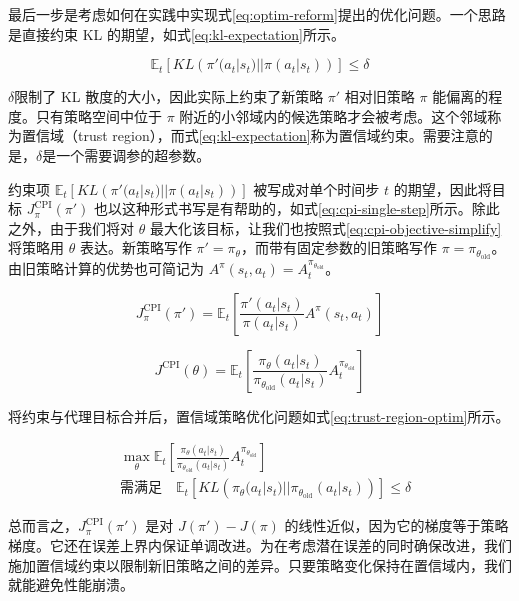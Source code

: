 \documentclass[lang=cn,newtx,10pt,scheme=chinese]{elegantbook}
\begin{document}
最后一步是考虑如何在实践中实现式\ref{eq:optim-reform}提出的优化问题。一个思路是直接约束 KL 的期望，如式\ref{eq:kl-expectation}所示。

\begin{equation}\label{eq:kl-expectation}
\mathbb{E}_t[KL\left(\pi'(a_t|s_t)||\pi(a_t|s_t)\right)]\leq\delta
\end{equation}

$\delta$限制了 KL 散度的大小，因此实际上约束了新策略 $\pi'$ 相对旧策略 $\pi$ 能偏离的程度。只有策略空间中位于 $\pi$ 附近的小邻域内的候选策略才会被考虑。这个邻域称为置信域（trust region），而式\ref{eq:kl-expectation}称为置信域约束。需要注意的是，$\delta$是一个需要调参的超参数。

约束项 $\mathbb{E}_t[KL\left(\pi'(a_t|s_t)||\pi(a_t|s_t)\right)]$ 被写成对单个时间步 $t$ 的期望，因此将目标 $J_\pi^\text{CPI}(\pi')$ 也以这种形式书写是有帮助的，如式\ref{eq:cpi-single-step}所示。除此之外，由于我们将对 $\theta$ 最大化该目标，让我们也按照式\ref{eq:cpi-objective-simplify}将策略用 $\theta$ 表达。新策略写作 $\pi'=\pi_\theta$，而带有固定参数的旧策略写作 $\pi=\pi_{\theta_\text{old}}$。由旧策略计算的优势也可简记为 $A^\pi(s_t,a_t)=A^{\pi_{\theta_\text{old}}}_t$。

\begin{equation}\label{eq:cpi-single-step}
J_\pi^\text{CPI}(\pi') = \mathbb{E}_t\left[ \frac{\pi'(a_t|s_t)}{\pi(a_t|s_t)}A^\pi(s_t,a_t) \right]
\end{equation}

\begin{equation}\label{eq:cpi-objective-simplify}
J^\text{CPI}(\theta) = \mathbb{E}_t\left[ \frac{\pi_\theta(a_t|s_t)}{\pi_{\theta_\text{old}}(a_t|s_t)}A_t^{\pi_{\theta_\text{old}}} \right]
\end{equation}

将约束与代理目标合并后，置信域策略优化问题如式\ref{eq:trust-region-optim}所示。

\begin{equation}\label{eq:trust-region-optim}
\begin{aligned}
& \max_\theta\mathbb{E}_t\left[ \frac{\pi_\theta(a_t|s_t)}{\pi_{\theta_\text{old}}(a_t|s_t)}A_t^{\pi_{\theta_\text{old}}} \right] \\
& \text{需满足}\quad\mathbb{E}_t[KL\left(\pi_\theta(a_t|s_t)||\pi_{\theta_\text{old}}(a_t|s_t)\right)]\leq\delta
\end{aligned}
\end{equation}

总而言之，$J_\pi^\text{CPI}(\pi')$ 是对 $J(\pi')-J(\pi)$ 的线性近似，因为它的梯度等于策略梯度。它还在误差上界内保证单调改进。为在考虑潜在误差的同时确保改进，我们施加置信域约束以限制新旧策略之间的差异。只要策略变化保持在置信域内，我们就能避免性能崩溃。
\end{document}
